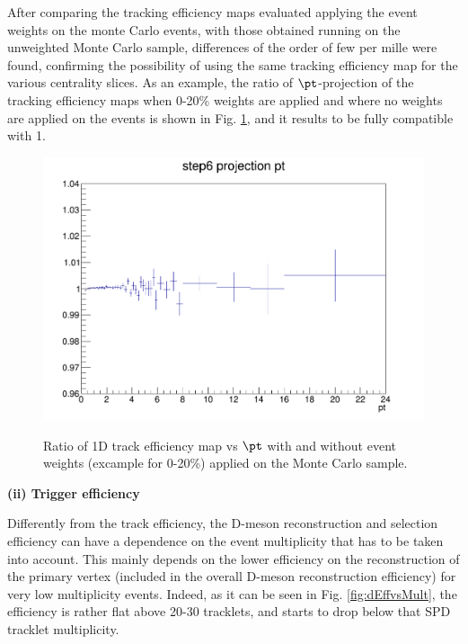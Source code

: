 After comparing the tracking efficiency maps evaluated applying the event weights on the monte Carlo events, with those obtained running on the unweighted Monte Carlo sample, differences of the order of few per mille were found, confirming the possibility of using the same tracking efficiency map for the various centrality slices.
As an example, the ratio of $\pt$-projection of the tracking efficiency maps when 0-20\% weights are applied and where no weights are applied on the events is shown in Fig. \ref{fig:TrackEFfWeights}, and it results to be fully compatible with 1.

\begin{figure}
\centering
{\includegraphics[width=0.7\linewidth]{figuresVsCent/Global/CrossCheck_TrackEffWeight.png}}
 \caption{Ratio of 1D track efficiency map vs $\pt$ with and without event weights (excample for 0-20\%) applied on the Monte Carlo sample.}
\label{fig:TrackEFfWeights}
\end{figure}

{\bf (ii) Trigger efficiency}

Differently from the track efficiency, the D-meson reconstruction and selection efficiency can have a dependence on the event multiplicity that has to be taken into account. This mainly depends on the lower efficiency on the reconstruction of the primary vertex (included in the overall D-meson reconstruction efficiency) for very low multiplicity events. Indeed, as it can be seen in Fig. \ref{fig:dEffvsMult}, the efficiency is rather flat above 20-30 tracklets, and starts to drop below that SPD tracklet multiplicity.

